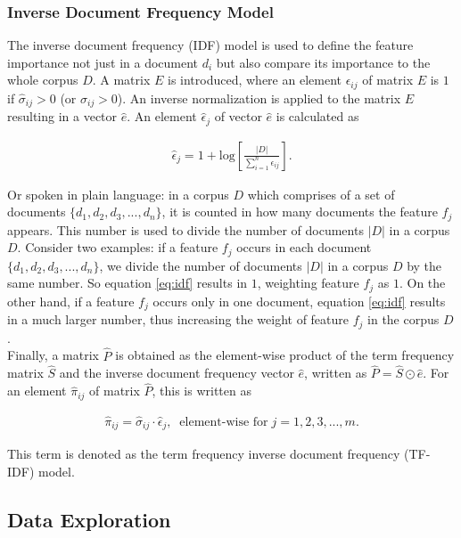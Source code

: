 \documentclass[a4paper,12pt,nottoc]{article}
\begin{document}
\subsubsection{Inverse Document Frequency Model}

The inverse document frequency (IDF) model is used to define the feature importance not just in a document $d_i$ but also compare its importance to the whole corpus $D$. A matrix $E$ is introduced, where an element $\epsilon_{ij}$ of matrix $E$ is $1$ if $\hat{\sigma}_{ij} > 0$ (or $\sigma_{ij} > 0$). An inverse normalization is applied to the matrix $E$ resulting in a vector $\hat{e}$. An element $\hat{\epsilon}_{j}$ of vector $\hat{e}$ is calculated as

\begin{gather}\label{eq:idf}
\hat{\epsilon}_{j} = 1 + \textrm{log}\left[\frac{|D|}{\sum_{i=1}^{n}\epsilon_{ij}}\right].
\end{gather}

\noindent Or spoken in plain language: in a corpus $D$ which comprises of a set of documents $\{d_1, d_2, d_3, ..., d_n\}$, it is counted in how many documents the feature $f_j$ appears. This number is used to divide the number of documents $|D|$ in a corpus $D$. Consider two examples: if a feature $f_j$ occurs in each document $\{d_1, d_2, d_3, ..., d_n\}$, we divide the number of documents $|D|$ in a corpus $D$ by the same number. So equation \ref{eq:idf} results in $1$, weighting feature $f_j$ as $1$. On the other hand, if a feature $f_j$ occurs only in one document, equation \ref{eq:idf} results in a much larger number, thus increasing the weight of feature $f_j$ in the corpus $D$.\\

\noindent Finally, a matrix $\hat{P}$ is obtained as the element-wise product of the term frequency matrix $\hat{S}$ and the inverse document frequency vector $\hat{e}$, written as $\hat{P} = \hat{S} \odot \hat{e}$. For an element $\hat{\pi}_{ij}$ of matrix $\hat{P}$, this is written as

\begin{gather}\label{eq:tf-idf}
\hat{\pi}_{ij} = \hat{\sigma}_{ij} \cdot \hat{\epsilon}_{j},\;\;\textrm{element-wise for}\;j = 1, 2, 3, ..., m .
\end{gather}

\noindent This term is denoted as the term frequency inverse document frequency (TF-IDF) model.

\subsection{Data Exploration}
\end{document}
